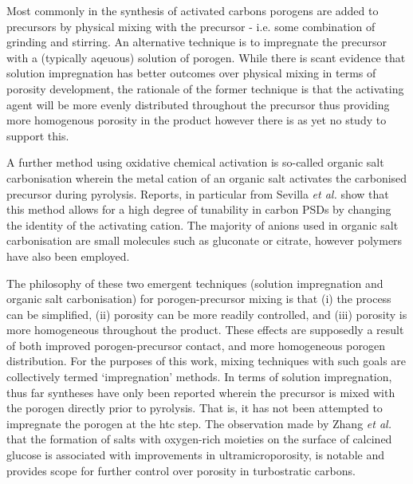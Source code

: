 Most commonly in the synthesis of activated carbons \glspl{porogen} are added to precursors by physical mixing with the precursor - i.e. some combination of grinding and stirring.\citep{Aljumialy2020Porous, Blankenship2017Cigarette, Altwala2020Predictable, Sevilla2016Highly} An alternative technique is to impregnate the precursor with a (typically aqeuous) solution of \gls{porogen}.\citep{Botome2017Preparation, Ge2019Highly, Adlak2021Physicochemical, Shi2021Copper, Han2021Mulch} While there is scant evidence that solution impregnation has better outcomes over physical mixing in terms of porosity development, the rationale of the former technique is that the \gls{activating agent} will be more evenly distributed throughout the precursor thus providing more homogenous porosity in the product however there is as yet no study to support this. 

A further method using oxidative chemical activation is so-called organic salt carbonisation wherein the metal cation of an organic salt activates the carbonised precursor during pyrolysis. Reports, in particular from Sevilla \textit{et al.} show that this method allows for a high degree of tunability in carbon PSDs by changing the identity of the activating cation.\citep{Sevilla2013general, Tsumura2014Structure, Ferrero2015Mesoporous, Ferrero2016Efficient, Fuertes2015Hierarchical, Roberts2015Hierarchically, Yadav20123D, Yang2018Spontaneous} The majority of anions used in organic salt carbonisation are small molecules such as gluconate or citrate,\citep{Sevilla2013general, Yang2017Template, Sevilla2014Direct, Tsumura2014Structure, Ferrero2015Mesoporous, Ferrero2016Efficient, Fuertes2015Hierarchical, Yang2020Production, Fuertes2014One} however polymers have also been employed.\citep{Puthusseri20143D, Roberts2015Hierarchically, Yadav20123D, Hines2004Surface} 

The philosophy of these two emergent techniques (solution impregnation and organic salt carbonisation) for porogen-precursor mixing is that (i) the process can be simplified, (ii) porosity can be more readily controlled, and (iii) porosity is more homogeneous throughout the product. These effects are supposedly a result of both improved \gls{porogen}-precursor contact, and more homogeneous \gls{porogen} distribution. For the purposes of this work, mixing techniques with such goals are collectively termed `impregnation' methods. In terms of solution impregnation, thus far syntheses have only been reported wherein the precursor is mixed with the \gls{porogen} directly prior to pyrolysis.\citep{Botome2017Preparation, Ge2019Highly, Adlak2021Physicochemical, Shi2021Copper, Han2021Mulch, Boujibar2018CO2} That is, it has not been attempted to impregnate the \gls{porogen} at the \gls{htc} step. The observation made by Zhang \textit{et al.} that the formation of  salts with oxygen-rich moieties on the surface of calcined glucose is associated with improvements in ultramicroporosity,\citep{Zhang2019situ} is notable and provides scope for further control over porosity in \glspl{turbostratic carbon}.

